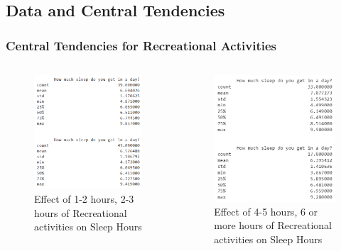 \documentclass[11pt,]{beamer}
\begin{document}
\subsection{Data and Central Tendencies}

\begin{frame}

    
	\frametitle{Central Tendencies for Recreational Activities}
	
	\begin{columns}[c]
	
	\begin{column}{.5\textwidth}
    	\begin{figure}
    		\includegraphics[width=6cm]{DF_List_1.png}
    		\caption{
    		\tiny{Effect of 1-2 hours, 2-3 hours of Recreational activities on Sleep Hours}
    		}
    	\end{figure}
	\end{column}

    \begin{column}{.5\textwidth}
    	\begin{figure}
    		\includegraphics[width=6cm]{DF_List_2.png}
    		\caption{
    		\tiny{Effect of 4-5 hours, 6 or more hours of Recreational activities on Sleep Hours}
    		}
    	\end{figure}
	\end{column}
	
    \end{columns}	
	
\end{frame}
\end{document}
